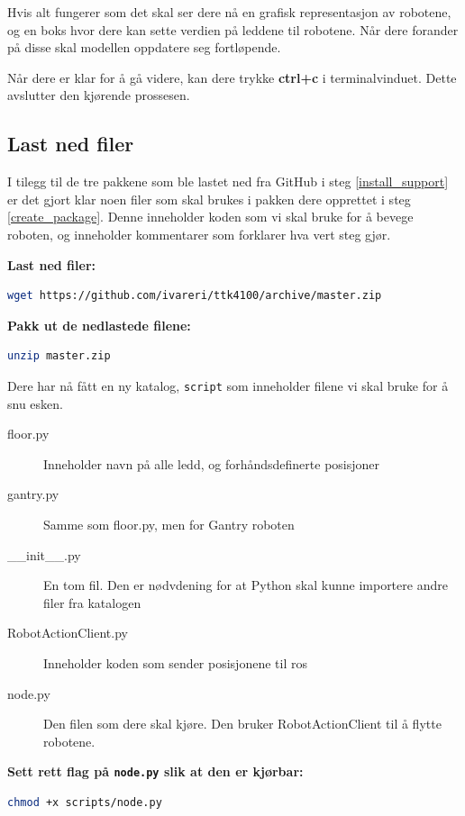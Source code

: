 \documentclass{article}
\begin{document}
Hvis alt fungerer som det skal ser dere nå en grafisk representasjon av robotene, og en boks hvor dere kan sette verdien på leddene til robotene. Når dere forander på disse skal modellen oppdatere seg fortløpende.

Når dere er klar for å gå videre, kan dere trykke \textbf{ctrl+c} i terminalvinduet. Dette avslutter den kjørende prossesen.

\subsection{Last ned filer}
I tilegg til de tre pakkene som ble lastet ned fra GitHub i steg \ref{install_support} er det gjort klar noen filer som skal brukes i pakken dere opprettet i steg \ref{create_package}. Denne inneholder koden som vi skal bruke for å bevege roboten, og inneholder kommentarer som forklarer hva vert steg gjør.

\noindent\textbf{Last ned filer:}
\begin{lstlisting}[language=bash]
wget https://github.com/ivareri/ttk4100/archive/master.zip
\end{lstlisting}

\noindent\textbf{Pakk ut de nedlastede filene:}
\begin{lstlisting}[language=bash]
unzip master.zip
\end{lstlisting}

Dere har nå fått en ny katalog, \texttt{script} som inneholder filene vi skal bruke for å snu esken. 

\begin{description}
\item[floor.py] Inneholder navn på alle ledd, og forhåndsdefinerte posisjoner
\item[gantry.py] Samme som floor.py, men for Gantry roboten
\item[\_\_init\_\_.py] En tom fil. Den er nødvdening for at Python skal kunne importere andre filer fra katalogen
\item[RobotActionClient.py] Inneholder koden som sender posisjonene til \gls{ros}
\item[node.py] Den filen som dere skal kjøre. Den bruker RobotActionClient til å flytte robotene.
\end{description}

\noindent\textbf{Sett rett flag på \texttt{node.py} slik at den er kjørbar:}
\begin{lstlisting}[language=bash]
chmod +x scripts/node.py
\end{lstlisting}
\end{document}
